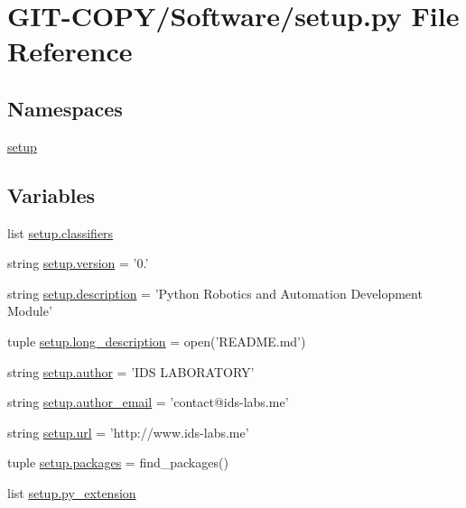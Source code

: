 \hypertarget{GIT-COPY_2Software_2setup_8py}{}\section{G\+I\+T-\/\+C\+O\+P\+Y/\+Software/setup.py File Reference}
\label{GIT-COPY_2Software_2setup_8py}
\subsection*{Namespaces}
\begin{DoxyCompactItemize}
\item 
 \hyperlink{namespacesetup}{setup}
\end{DoxyCompactItemize}
\subsection*{Variables}
\begin{DoxyCompactItemize}
\item 
list \hyperlink{namespacesetup_aa6d1b3ef82314b74854a1a1a473aadbf}{setup.\+classifiers}
\item 
string \hyperlink{namespacesetup_a8b86ddd5b5591d99de08e584197a53d9}{setup.\+version} = '0.'
\item 
string \hyperlink{namespacesetup_a4ad612547892c74be7035043265eb65c}{setup.\+description} = 'Python Robotics and Automation Development Module'
\item 
tuple \hyperlink{namespacesetup_a2e8655c91c2658305ee0ee4c023d59eb}{setup.\+long\+\_\+description} = open('R\+E\+A\+D\+M\+E.\+md')
\item 
string \hyperlink{namespacesetup_a7b92894168460f935bc49467954c4a92}{setup.\+author} = 'I\+D\+S L\+A\+B\+O\+R\+A\+T\+O\+R\+Y'
\item 
string \hyperlink{namespacesetup_a4ead8e1ca45242906fde7d5489f3beaa}{setup.\+author\+\_\+email} = 'contact@ids-\/labs.\+me'
\item 
string \hyperlink{namespacesetup_a7c3763764f99123690822c047e74c36e}{setup.\+url} = 'http\+://www.\+ids-\/labs.\+me'
\item 
tuple \hyperlink{namespacesetup_a61c4df0a151113447498726d453324de}{setup.\+packages} = find\+\_\+packages()
\item 
list \hyperlink{namespacesetup_af0c0e6d309529d5ba05aa1b7bf922b4f}{setup.\+py\+\_\+extension}
\end{DoxyCompactItemize}
